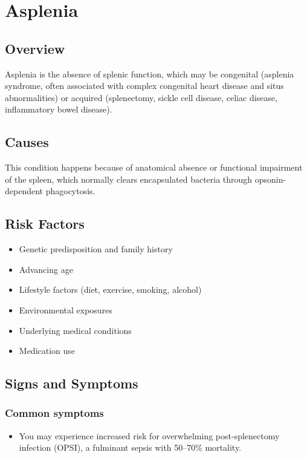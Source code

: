\chapter{Asplenia}
\label{sec:Asplenia}

\section{Overview}
Asplenia is the absence of splenic function, which may be congenital (asplenia syndrome, often associated with complex congenital heart disease and situs abnormalities) or acquired (splenectomy, sickle cell disease, celiac disease, inflammatory bowel disease).
\section{Causes}
This condition happens because of anatomical absence or functional impairment of the spleen, which normally clears encapsulated bacteria through opsonin-dependent phagocytosis.     
\section{Risk Factors}

\begin{itemize}[noitemsep]
  \item Genetic predisposition and family history
  \item Advancing age
  \item Lifestyle factors (diet, exercise, smoking, alcohol)
  \item Environmental exposures
  \item Underlying medical conditions
  \item Medication use
\end{itemize}
\section{Signs and Symptoms}

\subsection{Common symptoms}
\begin{itemize}[noitemsep]
  \item You may experience increased risk for overwhelming post-splenectomy infection (OPSI), a fulminant sepsis with 50--70\% mortality. 
  \end{itemize}

